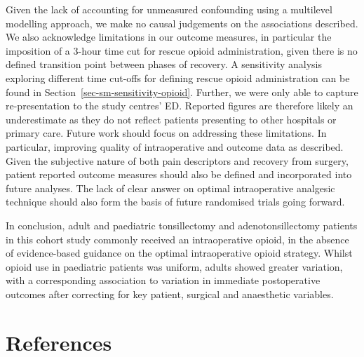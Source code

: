 \documentclass[
  letterpaper,
  DIV=11,
  numbers=noendperiod]{scrreprt}
\begin{document}
Given the lack of accounting for unmeasured confounding using a
multilevel modelling approach, we make no causal judgements on the
associations described. We also acknowledge limitations in our outcome
measures, in particular the imposition of a 3-hour time cut for rescue
opioid administration, given there is no defined transition point
between phases of recovery. A sensitivity analysis exploring different
time cut-offs for defining rescue opioid administration can be found in
Section~\ref{sec-sm-sensitivity-opioid}. Further, we were only able to
capture re-presentation to the study centres' ED. Reported figures are
therefore likely an underestimate as they do not reflect patients
presenting to other hospitals or primary care. Future work should focus
on addressing these limitations. In particular, improving quality of
intraoperative and outcome data as described. Given the subjective
nature of both pain descriptors and recovery from surgery, patient
reported outcome measures should also be defined and incorporated into
future analyses. The lack of clear answer on optimal intraoperative
analgesic technique should also form the basis of future randomised
trials going forward.

In conclusion, adult and paediatric tonsillectomy and adenotonsillectomy
patients in this cohort study commonly received an intraoperative
opioid, in the absence of evidence-based guidance on the optimal
intraoperative opioid strategy. Whilst opioid use in paediatric patients
was uniform, adults showed greater variation, with a corresponding
association to variation in immediate postoperative outcomes after
correcting for key patient, surgical and anaesthetic variables.


\chapter*{References}\label{references}

\end{document}
